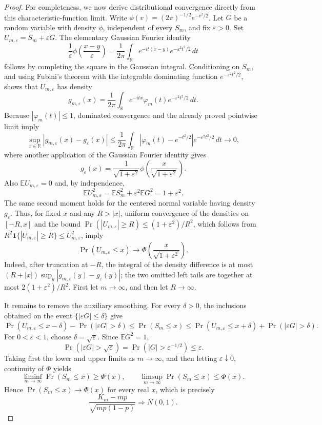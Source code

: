 \documentclass{article}
\begin{document}
\begin{proof}
For completeness, we now derive distributional convergence directly from this characteristic-function limit.  Write \(\phi(v)=(2\pi)^{-1/2}e^{-v^2/2}\).  Let \(G\) be a random variable with density \(\phi\), independent of every \(S_m\), and fix \(\varepsilon>0\).  Set \(U_{m,\varepsilon}=S_m+\varepsilon G\).  The elementary Gaussian Fourier identity
\[
 \frac{1}{\varepsilon}\phi\!\left(\frac{x-y}{\varepsilon}\right)
 =\frac{1}{2\pi}\int_{\mathbb R}
 e^{-it(x-y)}e^{-\varepsilon^2t^2/2}\,dt
\]
follows by completing the square in the Gaussian integral.  Conditioning on \(S_m\), and using Fubini's theorem with the integrable dominating function \(e^{-\varepsilon^2t^2/2}\), shows that \(U_{m,\varepsilon}\) has density
\[
 g_{m,\varepsilon}(x)=\frac{1}{2\pi}\int_{\mathbb R}
 e^{-itx}\varphi_m(t)e^{-\varepsilon^2t^2/2}\,dt.
\]
Because \(|\varphi_m(t)|\leq1\), dominated convergence and the already proved pointwise limit imply
\[
 \sup_{x\in\mathbb R}|g_{m,\varepsilon}(x)-g_{\varepsilon}(x)|
 \leq \frac{1}{2\pi}\int_{\mathbb R}
 |\varphi_m(t)-e^{-t^2/2}|e^{-\varepsilon^2t^2/2}\,dt
 \longrightarrow0,
\]
where another application of the Gaussian Fourier identity gives
\[
 g_{\varepsilon}(x)
 =\frac{1}{\sqrt{1+\varepsilon^2}}
 \phi\!\left(\frac{x}{\sqrt{1+\varepsilon^2}}\right).
\]
Also \(\mathbb E U_{m,\varepsilon}=0\) and, by independence,
\[
 \mathbb E U_{m,\varepsilon}^2
 =\mathbb E S_m^2+\varepsilon^2\mathbb E G^2
 =1+\varepsilon^2.
\]
The same second moment holds for the centered normal variable having density \(g_{\varepsilon}\).  Thus, for fixed \(x\) and any \(R>|x|\), uniform convergence of the densities on \([-R,x]\) and the bound \(\Pr(|U_{m,\varepsilon}|\geq R)\leq(1+\varepsilon^2)/R^2\), which follows from \(R^2\mathbf 1\{|U_{m,\varepsilon}|\geq R\}\leq U_{m,\varepsilon}^2\), imply
\[
 \Pr(U_{m,\varepsilon}\leq x)
 \longrightarrow
 \Phi\!\left(\frac{x}{\sqrt{1+\varepsilon^2}}\right).
\]
Indeed, after truncation at \(-R\), the integral of the density difference is at most \((R+|x|)\sup_y|g_{m,\varepsilon}(y)-g_{\varepsilon}(y)|\); the two omitted left tails are together at most \(2(1+\varepsilon^2)/R^2\).  First let \(m\to\infty\), and then let \(R\to\infty\).

It remains to remove the auxiliary smoothing.  For every \(\delta>0\), the inclusions obtained on the event \(\{|\varepsilon G|\leq\delta\}\) give
\[
 \Pr(U_{m,\varepsilon}\leq x-\delta)-\Pr(|\varepsilon G|>\delta)
 \leq \Pr(S_m\leq x)
 \leq \Pr(U_{m,\varepsilon}\leq x+\delta)+\Pr(|\varepsilon G|>\delta).
\]
For \(0<\varepsilon<1\), choose \(\delta=\sqrt\varepsilon\).  Since \(\mathbb E G^2=1\),
\[
 \Pr(|\varepsilon G|>\sqrt\varepsilon)
 =\Pr(|G|>\varepsilon^{-1/2})\leq\varepsilon.
\]
Taking first the lower and upper limits as \(m\to\infty\), and then letting \(\varepsilon\downarrow0\), continuity of \(\Phi\) yields
\[
 \liminf_{m\to\infty}\Pr(S_m\leq x)
 \geq\Phi(x),
 \qquad
 \limsup_{m\to\infty}\Pr(S_m\leq x)
 \leq\Phi(x).
\]
Hence \(\Pr(S_m\leq x)\to\Phi(x)\) for every real \(x\), which is precisely
\[
 \frac{K_m-mp}{\sqrt{mp(1-p)}}\Rightarrow N(0,1).
\]
\end{proof}
\end{document}
